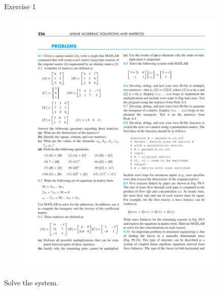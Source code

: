 \documentclass[xcolor=svgnames,t,10pt,allowframebreaks]{beamer}
\begin{document}
\begin{frame}[label={sec:org5ebc52c}]{Exercise 1}
\begin{figure}[H]

\includegraphics[width=0.9\textwidth]{fig/linear-example-03.pdf}
\end{figure}   

Solve the system. 
\end{frame}
\end{document}
